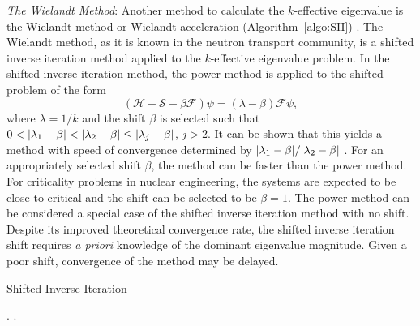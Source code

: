 \textit{The Wielandt Method}: Another method to calculate the $k$-effective eigenvalue is the Wielandt method or Wielandt acceleration (Algorithm~\ref{algo:SII}) \cite{yamamoto_reliable_2004}. The Wielandt method, as it is known in the neutron transport community, is a shifted inverse iteration method \cite{ipsen_computing_1997} applied to the $k$-effective eigenvalue problem. In the shifted inverse iteration method, the power method is applied to the shifted problem of the form
\begin{equation}
(\mathcal{H} - \mathcal{S} - \beta \mathcal{F})\psi = (\lambda - \beta) \mathcal{F} \psi,
\end{equation}
where $\lambda = 1/k$ and the shift $\beta$ is selected such that $0 < \lvert\lambda_{1} - \beta\rvert < \lvert\lambda_{2} - \beta\rvert \leq \lvert\lambda_{j} - \beta\rvert$, $j > 2$. It can be shown that this yields a method with speed of convergence determined by $\lvert\lambda_{1} - \beta\rvert/\lvert\lambda_{2} - \beta\rvert$ \cite{ipsen_computing_1997}. For an appropriately selected shift $\beta$, the method can be faster than the power method. For criticality problems in nuclear engineering, the systems are expected to be close to critical and the shift can be selected to be $\beta = 1$. The power method can be considered a special case of the shifted inverse iteration method with no shift. Despite its improved theoretical convergence rate, the shifted inverse iteration shift requires \textit{a priori} knowledge of the dominant eigenvalue magnitude. Given a poor shift, convergence of the method may be delayed.

\begin{algorithm}[H]
				\caption{Shifted Inverse Iteration \cite{ipsen_computing_1997}}
				\begin{algorithmic}[1]
						.
						.
					\ENDFOR
				\end{algorithmic}
				\label{algo:SII}
\end{algorithm}





